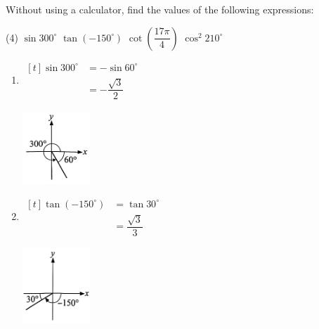 \documentclass{report}
\begin{document}
\newpage
\begin{question}
    Without using a calculator, find the values of the following expressions:
    \begin{tasks}[label=(\alph*)](4)
        \task $\sin 300^\circ$
        \task $\tan\left(-150^\circ\right)$
        \task $\cot\left(\dfrac{17\pi}{4}\right)$
        \task $\cos^2 210^\circ$
    \end{tasks}

    \sol{}
    \vspace{-1em}
        \begin{enumerate}[label=(\alph*),leftmargin=*]
            \item \begin{multicols}{2}
                $\begin{aligned}[t]
                    \sin 300^\circ &= -\sin 60^\circ \\
                    &= -\dfrac{\sqrt{3}}{2}
                \end{aligned}$
                \vfill\null
                \begin{center}
                    \includegraphics[width=0.2\textwidth]{assets/9-13.jpg}
                \end{center}
            \end{multicols}
            \vspace{-3.2em}
            \item \begin{multicols}{2}
                $\begin{aligned}[t]
                    \tan\left(-150^\circ\right) &= \tan 30^\circ \\
                    &= \dfrac{\sqrt{3}}{3}
                \end{aligned}$
                \vfill\null
                \begin{center}
                    \includegraphics[width=0.2\textwidth]{assets/9-14.jpg}

\end{center}
\end{multicols}
\end{enumerate}
\end{question}
\end{document}
